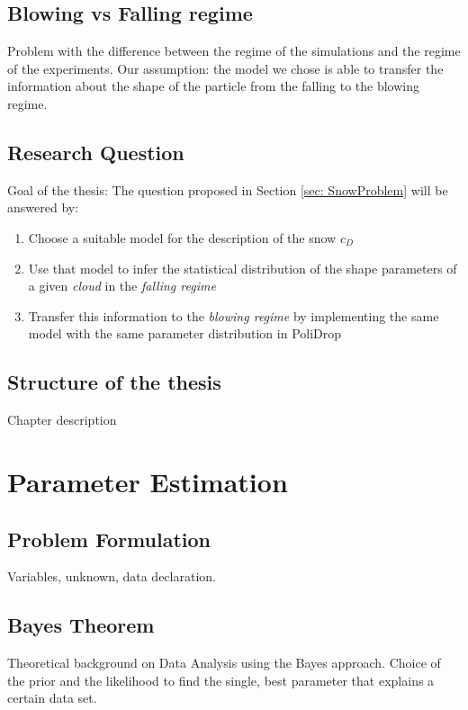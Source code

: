 \documentclass[a4paper,12pt,twoside,titlepage,openright]{book}
\newcommand{\sref}[1]{Section \ref{#1}}
\begin{document}
	\section{Blowing vs Falling regime}
		Problem with the difference between the regime of the simulations and the regime of the experiments. Our assumption: the model we chose is able to transfer the information about the shape of the particle from the falling to the blowing regime.

		
	\section{Research Question}
		Goal of the thesis: The question proposed in \sref{sec: SnowProblem} will be answered by:
		\begin{enumerate}
			\item Choose a suitable model for the description of the snow $ c_D $
			\item Use that model to infer the statistical distribution of the shape parameters of a given \textit{cloud} in the \textit{falling regime}
			\item Transfer this information to the \textit{blowing regime} by implementing the same model with the same parameter distribution in PoliDrop
		\end{enumerate}	

	\section{Structure of the thesis}
		Chapter description
		
		


\chapter{Parameter Estimation}
	\section{Problem Formulation}
		Variables, unknown, data declaration.

	\section{Bayes Theorem}
		Theoretical background on Data Analysis using the Bayes approach. Choice of the prior and the likelihood to find the single, best parameter that explains a certain data set.
		
\end{document}
